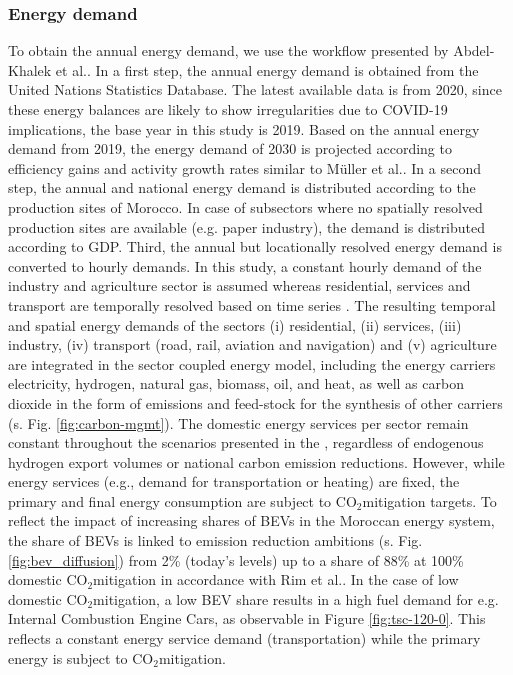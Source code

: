 \documentclass[5p,numafflabel]{elsarticle}
\newcommand{\co}{\ce{CO2}~}
\def\co{CO${}_2${\:}}
\begin{document}
\subsubsection*{Energy demand}
To obtain the annual energy demand, we use the workflow presented by Abdel-Khalek et al.\cite{Abdel-Khalek2024}. In a first step, the annual energy demand is obtained from the United Nations Statistics Database\cite{unstats2023}. The latest available data is from 2020, since these energy balances are likely to show irregularities due to COVID-19 implications, the base year in this study is 2019. Based on the annual energy demand from 2019, the energy demand of 2030 is projected according to efficiency gains and activity growth rates similar to M{\"u}ller et al.\cite{Muller2023}.
In a second step, the annual and national energy demand is distributed according to the production sites of Morocco.
In case of subsectors where no spatially resolved production sites are available (e.g. paper industry), the demand is distributed according to GDP.
Third, the annual but locationally resolved energy demand is converted to hourly demands. In this study, a constant hourly demand of the industry and agriculture sector is assumed whereas residential, services and transport are temporally resolved based on time series \cite{Brown2018a,Neumann2023,Abdel-Khalek2024}. 
The resulting temporal and spatial energy demands of the sectors
(i) residential,
(ii) services,
(iii) industry,
(iv) transport (road, rail, aviation and navigation) and
(v) agriculture
are integrated in the sector coupled energy model, including the energy carriers electricity, hydrogen, natural gas, biomass, oil, and heat, as well as carbon dioxide in the form of emissions and feed-stock for the synthesis of other carriers (s. Fig. \ref{fig:carbon-mgmt}). 
The domestic energy services per sector remain constant throughout the scenarios presented in the , regardless of endogenous hydrogen export volumes or national carbon emission reductions. However, while energy services (e.g., demand for transportation or heating) are fixed, the primary and final energy consumption are subject to \co mitigation targets. To reflect the impact of increasing shares of BEVs in the Moroccan energy system, the share of BEVs is linked to emission reduction ambitions (s. Fig. \ref{fig:bev_diffusion}) from 2\% (today's levels) up to a share of 88\% at 100\% domestic \co mitigation in accordance with Rim et al.\cite{Rim2021}.
In the case of low domestic \co mitigation, a low BEV share results in a high fuel demand for e.g. Internal Combustion Engine Cars, as observable in Figure \ref{fig:tsc-120-0}. This reflects a constant energy service demand (transportation) while the primary energy is subject to \co mitigation.
\end{document}
